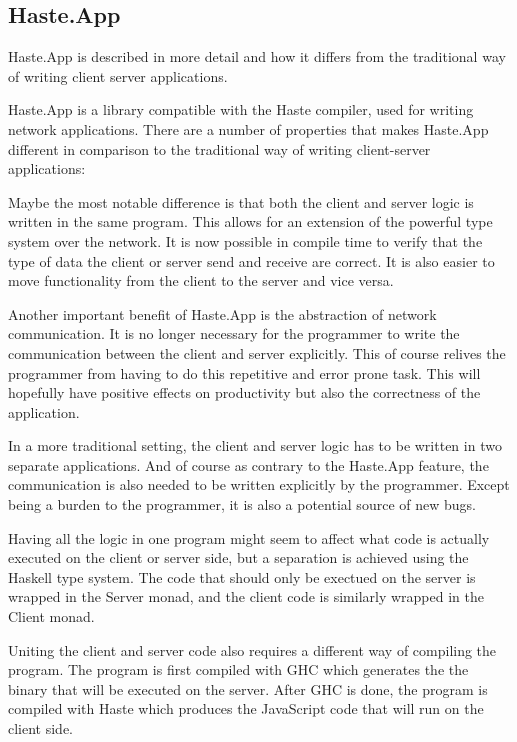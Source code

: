 \documentclass[a4paper]{article}
\begin{document}
\subsection{Haste.App}
Haste.App is described in more detail and how it differs from the traditional way of writing client server applications.

Haste.App is a library compatible with the Haste compiler, used for writing network applications. 
There are a number of properties that makes Haste.App different in comparison to the traditional way of 
writing client-server applications: 

Maybe the most notable difference is that both the client and server logic is written in the same program.
This allows for an extension of the powerful type system over the network. It is now possible in compile time 
to verify that the type of data the client or server send and receive are correct. It is also easier to 
move functionality from the client to the server and vice versa.

Another important benefit of Haste.App is the abstraction of network communication. It is no longer 
necessary for the programmer to write the communication between the client and server explicitly. This 
of course relives the programmer from having to do this repetitive and error prone task. This will hopefully
have positive effects on productivity but also the correctness of the application. 

In a more traditional setting, the client and server logic has to be written in two separate applications. And of course as
contrary to the Haste.App feature, the communication is also needed to be written explicitly by the programmer. Except being 
a burden to the programmer, it is also a potential source of new bugs. 

Having all the logic in one program might seem to affect what code is actually executed on the client or server side, but
a separation is achieved using the Haskell type system. The code that should only be exectued on the server is wrapped in the 
Server monad, and the client code is similarly wrapped in the Client monad. 

Uniting the client and server code also requires a different way of compiling the program. The program is first compiled
with GHC which generates the the binary that will be executed on the server. After GHC is done, the program is compiled with 
Haste which produces the JavaScript code that will run on the client side.
\end{document}

